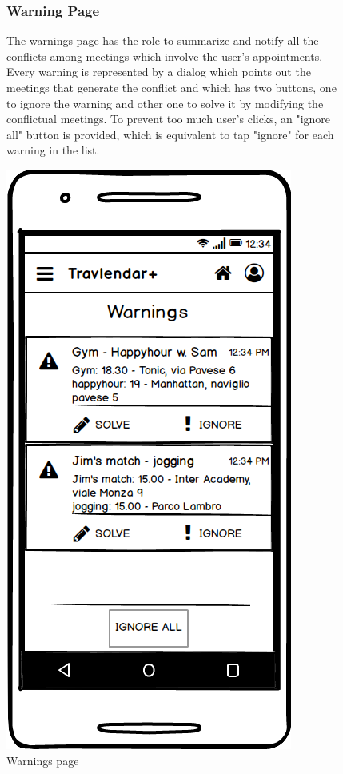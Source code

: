 	\begin{figure}
			\begin{flushleft}
			\subsubsection{Warning Page}
			The warnings page has the role to summarize and notify all the conflicts among meetings which involve the user's appointments. Every warning is represented by a dialog which points out the meetings that generate the conflict and which has two buttons, one to ignore the warning and other one to solve it by modifying the conflictual meetings. 
			To prevent too much user's clicks, an "ignore all" button is provided, which is equivalent to tap "ignore" for each warning in the list. 
		\end{flushleft}
		\centering
		\includegraphics[width=0.6\linewidth]{mockups/Warnings}
		\caption{Warnings page}
		\label{fig:warnings}
	\end{figure}
\clearpage

